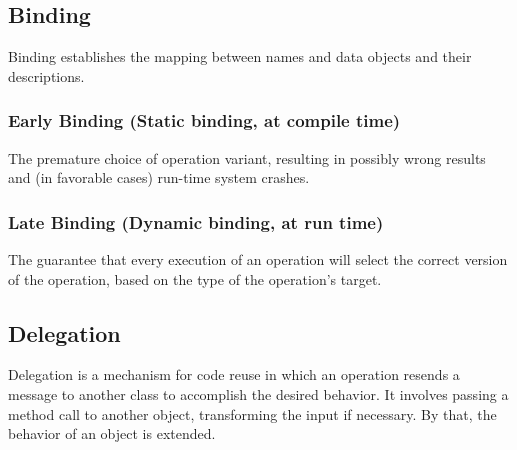\subsection{Binding}
Binding establishes the mapping between names and data objects and their descriptions.

\subsubsection*{Early Binding (Static binding, at compile time)}
The premature choice of operation variant, resulting in possibly wrong results and (in favorable cases) run-time system crashes.

\subsubsection*{Late Binding (Dynamic binding, at run time)}
The guarantee that every execution of an operation will select the correct version of the operation, based on the type of the operation's target.

\subsection{Delegation}
Delegation is a mechanism for code reuse in which an operation resends a message to another class to accomplish the desired behavior.
It involves passing a method call to another object, transforming the input if necessary.
By that, the behavior of an object is extended.

\newpage
